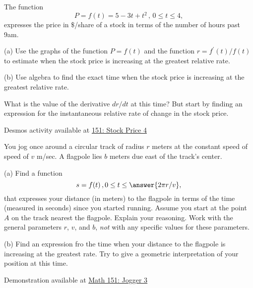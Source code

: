 \documentclass{ximera}
\begin{document}
\begin{question}  \label{Q:dfgt4tnhy}
The function 
\[
      P = f(t) = 5 -3t + t^2 \, , \, 0\leq t \leq 4 , 
\]
expresses the price in $\$$/share of a stock in terms of the number of hours past 9am.

(a) Use the graphs of the function $P=f(t)$ and the function $r=f^\prime(t)/f(t)$  to estimate when the stock price is increasing at the greatest relative rate.

(b) Use algebra to find the exact time when the stock price is increasing at the greatest relative rate.
\begin{hint}
What is the value of the derivative $dr/dt$ at this time? But start by finding an expression for the instantaneous relative rate of change in the stock price.
\end{hint}


\begin{onlineOnly}
    \begin{center}
\end{center}
\end{onlineOnly}

Desmos activity available at \href{https://www.desmos.com/calculator/xuupp3srqv}{151: Stock Price 4}

\end{question}


\begin{question}  \label{Qdgvbjuhjyhu}
You jog once around a circular track of radius $r$ meters at the constant speed of speed of $v$ m/sec. A flagpole lies $b$ meters due east of the track's center.

(a) Find a function 
\[
   s = f(t) \, , 0\leq t \leq  \answer{2\pi r/v},
\]
that expresses your distance (in meters) to the flagpole in terms of the time (measured in seconds) since you started running. Assume you start at the point $A$ on the track nearest the flagpole. Explain your reasoning. Work with the general parameters $r$, $v$, and $b$, \emph{not} with any specific values for these parameters.


(b) Find an expression fro the time when your distance to the flagpole is increasing at the greatest rate. Try to give a geometric interpretation of your position at this time.

\begin{onlineOnly}
    \begin{center}
\end{center}
\end{onlineOnly}

Demonstration available at \href{https://www.desmos.com/calculator/bxofhvfbfs}{Math 151: Jogger 3}


\end{question}
\end{document}
